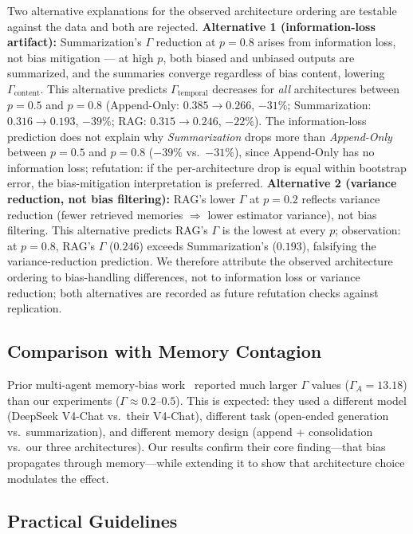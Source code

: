 \documentclass[11pt]{article}
\begin{document}
Two alternative explanations for the observed architecture ordering are testable against the data and both are rejected. \textbf{Alternative 1 (information-loss artifact):} Summarization's $\Gamma$ reduction at $p=0.8$ arises from information loss, not bias mitigation --- at high $p$, both biased and unbiased outputs are summarized, and the summaries converge regardless of bias content, lowering $\Gamma_{\text{content}}$. This alternative predicts $\Gamma_{\text{temporal}}$ decreases for \emph{all} architectures between $p=0.5$ and $p=0.8$ (Append-Only: $0.385 \to 0.266$, $-31\%$; Summarization: $0.316 \to 0.193$, $-39\%$; RAG: $0.315 \to 0.246$, $-22\%$). The information-loss prediction does not explain why \emph{Summarization} drops more than \emph{Append-Only} between $p=0.5$ and $p=0.8$ ($-39\%$ vs.\ $-31\%$), since Append-Only has no information loss; refutation: if the per-architecture drop is equal within bootstrap error, the bias-mitigation interpretation is preferred. \textbf{Alternative 2 (variance reduction, not bias filtering):} RAG's lower $\Gamma$ at $p=0.2$ reflects variance reduction (fewer retrieved memories $\Rightarrow$ lower estimator variance), not bias filtering. This alternative predicts RAG's $\Gamma$ is the lowest at every $p$; observation: at $p=0.8$, RAG's $\Gamma$ ($0.246$) exceeds Summarization's ($0.193$), falsifying the variance-reduction prediction. We therefore attribute the observed architecture ordering to bias-handling differences, not to information loss or variance reduction; both alternatives are recorded as future refutation checks against replication.

\subsection{Comparison with Memory Contagion}

Prior multi-agent memory-bias work~\cite{bertalanic2026cost,huang2026cagecal} reported much larger $\Gamma$ values ($\Gamma_A = 13.18$) than our experiments ($\Gamma \approx 0.2$--$0.5$). This is expected: they used a different model (DeepSeek V4-Chat vs.\ their V4-Chat), different task (open-ended generation vs.\ summarization), and different memory design (append + consolidation vs.\ our three architectures). Our results confirm their core finding---that bias propagates through memory---while extending it to show that architecture choice modulates the effect.

\subsection{Practical Guidelines}
\end{document}
